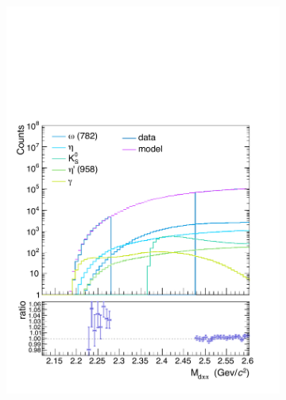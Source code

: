 \begin{figure} [htb]
\begin{subfigure}{.33\textwidth}
  \centering
  \captionsetup{justification=centering}
  \includegraphics[width=\linewidth]{gfx/can0}
  \caption{}
  \label{fig:tem01}
\end{subfigure}%
\begin{subfigure}{.33\textwidth}
  \centering
  \captionsetup{justification=centering}

\end{subfigure}
\end{figure}
